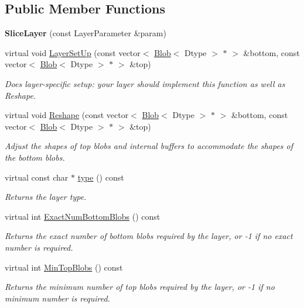 \subsection*{Public Member Functions}
\begin{DoxyCompactItemize}
\item 
{\bfseries Slice\+Layer} (const Layer\+Parameter \&param)\hypertarget{classcaffe_1_1SliceLayer_a2d4001e14fba5c1e64595f1d1a05c957}{}\label{classcaffe_1_1SliceLayer_a2d4001e14fba5c1e64595f1d1a05c957}

\item 
virtual void \hyperlink{classcaffe_1_1SliceLayer_a8794f345b232cca84b1269d1635d1e7c}{Layer\+Set\+Up} (const vector$<$ \hyperlink{classcaffe_1_1Blob}{Blob}$<$ Dtype $>$ $\ast$ $>$ \&bottom, const vector$<$ \hyperlink{classcaffe_1_1Blob}{Blob}$<$ Dtype $>$ $\ast$ $>$ \&top)
\begin{DoxyCompactList}\small\item\em Does layer-\/specific setup\+: your layer should implement this function as well as Reshape. \end{DoxyCompactList}\item 
virtual void \hyperlink{classcaffe_1_1SliceLayer_a6d833c7af60bf9c90cf0de5a039df8e3}{Reshape} (const vector$<$ \hyperlink{classcaffe_1_1Blob}{Blob}$<$ Dtype $>$ $\ast$ $>$ \&bottom, const vector$<$ \hyperlink{classcaffe_1_1Blob}{Blob}$<$ Dtype $>$ $\ast$ $>$ \&top)
\begin{DoxyCompactList}\small\item\em Adjust the shapes of top blobs and internal buffers to accommodate the shapes of the bottom blobs. \end{DoxyCompactList}\item 
virtual const char $\ast$ \hyperlink{classcaffe_1_1SliceLayer_ad442012d935a8e49f75157959b235f2f}{type} () const \hypertarget{classcaffe_1_1SliceLayer_ad442012d935a8e49f75157959b235f2f}{}\label{classcaffe_1_1SliceLayer_ad442012d935a8e49f75157959b235f2f}

\begin{DoxyCompactList}\small\item\em Returns the layer type. \end{DoxyCompactList}\item 
virtual int \hyperlink{classcaffe_1_1SliceLayer_a7f140bb3775c60a2d3d60298802d2b85}{Exact\+Num\+Bottom\+Blobs} () const 
\begin{DoxyCompactList}\small\item\em Returns the exact number of bottom blobs required by the layer, or -\/1 if no exact number is required. \end{DoxyCompactList}\item 
virtual int \hyperlink{classcaffe_1_1SliceLayer_a7e2a0c1b2e766e4f156a0c277f1c4810}{Min\+Top\+Blobs} () const 
\begin{DoxyCompactList}\small\item\em Returns the minimum number of top blobs required by the layer, or -\/1 if no minimum number is required. \end{DoxyCompactList}\end{DoxyCompactItemize}
